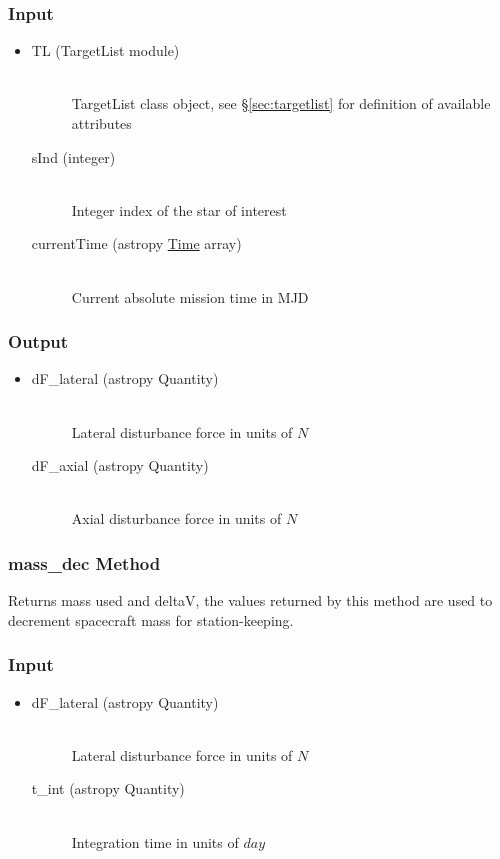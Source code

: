 \documentclass[cleanfoot]{asme2ej}
\begin{document}
\subsubsection*{Input}
\begin{itemize}
\item
\begin{description}
    \item[TL (TargetList module)] \hfill \\ TargetList class object, see \S\ref{sec:targetlist} for definition of available attributes
    \item[sInd (integer)] \hfill \\ Integer index of the star of interest
    \item[currentTime (astropy \href{http://astropy.readthedocs.org/en/latest/time/index.html}{Time} array)] \hfill \\ Current absolute mission time in MJD
\end{description}
\end{itemize}
\subsubsection*{Output}
\begin{itemize}
\item 
\begin{description}
    \item[dF\_lateral (astropy Quantity)] \hfill \\ Lateral disturbance force in units of $N$
    \item[dF\_axial (astropy Quantity)] \hfill \\ Axial disturbance force in units of $N$
\end{description}
\end{itemize}

\subsubsection{mass\_dec Method} 
Returns mass used and deltaV, the values returned by this method are used to decrement spacecraft mass for station-keeping.
\subsubsection*{Input}
\begin{itemize}
\item
\begin{description}
    \item[dF\_lateral (astropy Quantity)] \hfill \\ Lateral disturbance force in units of $N$
    \item[t\_int (astropy Quantity)] \hfill \\ Integration time in units of $day$
\end{description}
\end{itemize}
\end{document}
